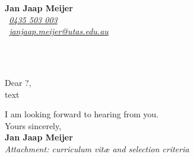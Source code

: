 \documentclass[11pt]{article}
\def\firstname{Jan Jaap}
\def\familyname{Meijer}
\def\FileAuthor{\firstname{ }\familyname}
\begin{document}
\sffamily   %
\hfill%
\begin{minipage}[t]{.6\textwidth}
\raggedleft%
{\bfseries \FileAuthor}\\[.35ex]
\small\itshape%
\Telefon~\href{tel:0061435503003}{0435 503 003}\\
\Letter~\href{mailto:janjaap.meijer@utas.edu.au}{janjaap.meijer@utas.edu.au}
\end{minipage}\\[1em]
%
\\[1em] %
\raggedright
Dear ?,\\[1.5em]
%

text

I am looking forward to hearing from you.\\[1.5em]

Yours sincerely,\\[3em] %
%
{\bfseries \FileAuthor}\\
%
\vfill%
{\slshape Attachment: curriculum vit\ae{} and selection criteria}
\end{document}
